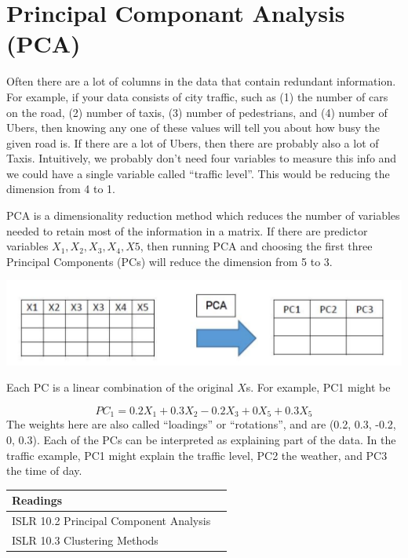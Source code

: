 \documentclass[
  openany]{book}
\begin{document}
\hypertarget{principal-componant-analysis-pca}{%
\section{Principal Componant Analysis (PCA)}\label{principal-componant-analysis-pca}}

Often there are a lot of columns in the data that contain redundant information. For example, if your data consists of city traffic, such as (1) the number of cars on the road, (2) number of taxis, (3) number of pedestrians, and (4) number of Ubers, then knowing any one of these values will tell you about how busy the given road is. If there are a lot of Ubers, then there are probably also a lot of Taxis. Intuitively, we probably don't need four variables to measure this info and we could have a single variable called ``traffic level''. This would be reducing the dimension from 4 to 1.

PCA is a dimensionality reduction method which reduces the number of variables needed to retain most of the information in a matrix. If there are predictor variables \(X_1, X_2, X_3, X_4, X5\), then running PCA and choosing the first three Principal Components (PCs) will reduce the dimension from 5 to 3.

\begin{center}\includegraphics[width=10.47in]{images/PCA} \end{center}

Each PC is a linear combination of the original \(X\)s. For example, PC1 might be

\[PC_1 = 0.2X_1 + 0.3X_2 - 0.2X_3 + 0X_5 + 0.3X_5\]
The weights here are also called ``loadings'' or ``rotations'', and are (0.2, 0.3, -0.2, 0, 0.3). Each of the PCs can be interpreted as explaining part of the data. In the traffic example, PC1 might explain the traffic level, PC2 the weather, and PC3 the time of day.

\begin{longtable}[]{@{}ll@{}}
\toprule
Readings &\tabularnewline
\midrule
\endhead
ISLR 10.2 Principal Component Analysis &\tabularnewline
ISLR 10.3 Clustering Methods &\tabularnewline
\bottomrule
\end{longtable}
\end{document}
